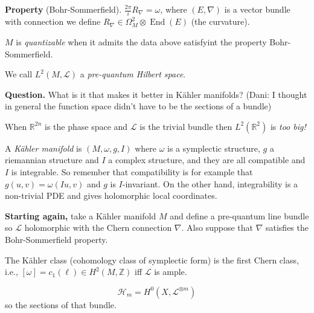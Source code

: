 \medskip\noindent
{\bf Property} (Bohr-Sommerfield).
$\frac{2\pi}{i}R_\nabla =\omega$, where
$(E,\nabla )$ is a vector bundle with
connection we define $R_\nabla
\in\Omega^{2}_M \otimes
\operatorname{End}(E)$ (the curvature).

\begin{definition}
\label{definition-suassuna-quantizable}
$M$ is \emph{quantizable} when it admits the
data above satisfyint the property
Bohr-Sommerfield.

We call $L^2(M,\mathcal{L})$ a
\emph{pre-quantum Hilbert space}.
\end{definition}

\medskip\noindent
{\bf Question.}
What is it that makes it better in Kähler
manifolds? (Dani: I thought in general the
function space didn't have to be the sections
of a bundle)

\begin{remark}[Sergey]
\label{remark-suassuna-too-big}
When $\mathbb{R}^{2n}$ is the phase space and
$\mathcal{L}$ is the trivial bundle then
$L^2( \mathbb{R}^{2} )$ is \emph{too big!}
\end{remark}

\begin{definition}
\label{definition-suassuna-kahler}
A \emph{K\"ahler manifold} is $(M,
\omega,g,I)$ where $\omega$ is a symplectic
structure, $g$ a riemannian structure and $I$
a complex structure, and they are all
compatible and $I$ is integrable. So remember
that compatibility is for example that
$g(u,v)=\omega(Iu,v)$ and $g$ is
$I$-invariant. On the other hand,
integrability is a non-trivial PDE and gives
holomorphic local coordinates.
\end{definition}

{\bf Starting again,}\hspace{.5em} take a
K\"ahler manifold $M$ and define a
pre-quantum line bundle so $\mathcal{L}$
holomorphic with the Chern connection
$\nabla$. Also suppose that $\nabla$
satisfies the Bohr-Sommerfield property.

\begin{remark}
\label{remark-suassuna-kodaira}
The K\"ahler class (cohomology class of
symplectic form) is the first Chern class,
i.e., $[\omega]=c_1(\ell)\in
H^{2}(M,\mathbb{Z})$ iff $\mathcal{L}$ is
ample.
\end{remark}

\begin{definition}
\label{definition-suassuna-hilbert-space}
$$
\mathcal{H}_m=H^{0}(X,\mathcal{L}^{\otimes
m})
$$
so the sections of that bundle.
\end{definition}

